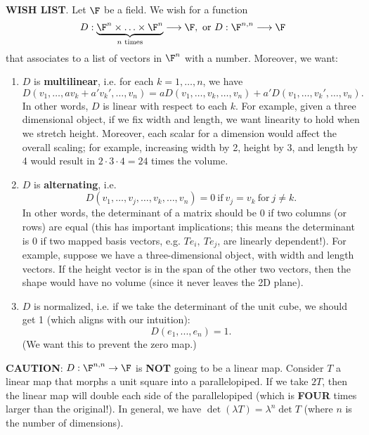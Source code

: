 \documentclass[math0540-lecture-notes.tex]{subfiles}
\begin{document}
\textbf{WISH LIST}. Let $\F$ be a field. We wish for a function \[
  D: \underbrace{\F^{n}\times \ldots\times \F^{n}}_\text{$n$ times}\longrightarrow \F, ~\text{or}~
  D:\F^{n,n}\longrightarrow \F
\] that associates to a list of vectors in $\F^n$ with a number. Moreover, we want:
\begin{enumerate}
  \item $D$ is \textbf{multilinear}, i.e. for each $k=1,\ldots,n$, we have \[
        D(v_1,\ldots,av_k+a'v_k',\ldots,v_n)=aD(v_1,\ldots,v_k,\ldots,v_n)+a'D(v_1,\ldots,v_k',\ldots,v_n)
    .\] In other words, $D$ is linear with respect to each $k$. For example, given a three
    dimensional object, if we fix width and length, we want linearity to hold when we stretch
    height. Moreover, each scalar for a dimension would affect the overall scaling; for example,
    increasing width by 2, height by 3, and length by 4 would result in $2\cdot 3\cdot 4=24$ times
    the volume.
  \item $D$ is \textbf{alternating}, i.e. \[
      D(v_1,\ldots,v_j,\ldots,v_k,\ldots,v_n)=0 ~\text{if}~ v_j=v_k ~\text{for}~ j\neq k
    .\] In other words, the determinant of a matrix should be $0$ if two columns (or rows) are equal
    (this has important implications; this means the determinant is $0$ if two mapped basis vectors,
    e.g. $Te_i,\ Te_j$, are linearly dependent!).  For example, suppose we have a three-dimensional
    object, with width and length vectors. If the height vector is in the span of the other two
    vectors, then the shape would have no volume (since it never leaves the 2D plane).
  \item $D$ is normalized, i.e. if we take the determinant of the unit cube, we should get 1 (which
    aligns with our intuition): \[
    D(e_1,...,e_n)=1
  .\] (We want this to prevent the zero map.)
\end{enumerate}

\begin{remark}
  \textbf{CAUTION}: $D:\F^{n,n}\to \F$ is \textbf{NOT} going to be a linear map. Consider $T$ a
  linear map that morphs a unit square into a parallelopiped. If we take $2T$, then the linear map
  will double each side of the parallelopiped (which is \textbf{FOUR} times larger than the
  original!). In general, we have $\det{(\lambda T)}=\lambda^n\det{T}$ (where $n$ is the number of
  dimensions).
\end{remark}
\end{document}
